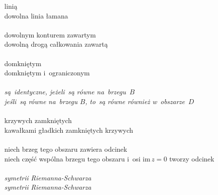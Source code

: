 \documentclass[a4paper,11pt]{article}
\begin{document}
\Jest linią \\
\Powin dowolna linia łamana \\
 \\
\Jest dowolnym konturem zawartym \\
\Powin  dowolną drogą całkowania zawartą \\
 \\
\Jest domkniętym \\
\Powin  domkniętym i~ograniczonym \\
 \\
\Jest \emph{są~identyczne, jeżeli~są równe na~brzegu~$B$} \\
\Powin \emph{jeśli~są równe na~brzegu $B$, to~są równe również
  w~obszarze~$D$} \\
 \\
\Jest krzywych zamkniętych \\
\Powin  kawałkami gładkich zamkniętych krzywych \\
 \\
\Jest niech brzeg tego obszaru zawiera odcinek \\
\Powin niech część wspólna brzegu tego obszaru i~osi
$\textrm{im}\, z = 0$
tworzy odcinek \\
 \\
\Jest \emph{symetrii{ }{ } Riemanna-Schwarza} \\
\Powin \emph{symetrii Riemanna-Schwarza}

\vspace{\spaceTwo}











 {}




\end{document}
